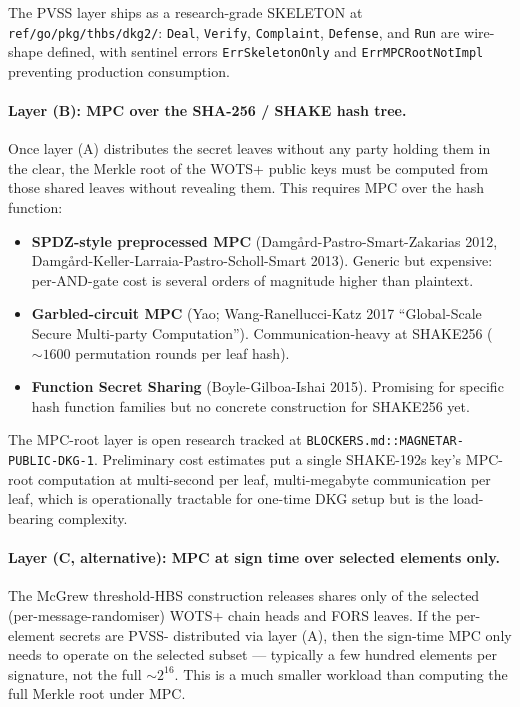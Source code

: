 The PVSS layer ships as a research-grade SKELETON at
\texttt{ref/go/pkg/thbs/dkg2/}:
\texttt{Deal}, \texttt{Verify}, \texttt{Complaint},
\texttt{Defense}, and \texttt{Run} are wire-shape defined, with
sentinel errors \texttt{ErrSkeletonOnly} and
\texttt{ErrMPCRootNotImpl} preventing production consumption.

\paragraph{Layer (B): MPC over the SHA-256 / SHAKE hash tree.}
Once layer (A) distributes the secret leaves without any party
holding them in the clear, the Merkle root of the WOTS+ public
keys must be computed from those shared leaves without
revealing them. This requires MPC over the hash function:
\begin{itemize}[leftmargin=2em,nosep]
  \item \textbf{SPDZ-style preprocessed MPC}
        (Damg{\aa}rd-Pastro-Smart-Zakarias 2012,
        Damg{\aa}rd-Keller-Larraia-Pastro-Scholl-Smart 2013).
        Generic but expensive: per-AND-gate cost is several
        orders of magnitude higher than plaintext.
  \item \textbf{Garbled-circuit MPC} (Yao;
        Wang-Ranellucci-Katz 2017 ``Global-Scale Secure
        Multi-party Computation''). Communication-heavy at
        SHAKE256 ($\sim 1600$ permutation rounds per leaf hash).
  \item \textbf{Function Secret Sharing} (Boyle-Gilboa-Ishai
        2015). Promising for specific hash function families
        but no concrete construction for SHAKE256 yet.
\end{itemize}

The MPC-root layer is open research tracked at
\texttt{BLOCKERS.md::MAGNETAR-PUBLIC-DKG-1}. Preliminary cost
estimates put a single SHAKE-192s key's MPC-root computation at
multi-second per leaf, multi-megabyte communication per leaf,
which is operationally tractable for one-time DKG setup but is
the load-bearing complexity.

\paragraph{Layer (C, alternative): MPC at sign time over selected
elements only.} The McGrew threshold-HBS construction releases
shares only of the selected (per-message-randomiser) WOTS+ chain
heads and FORS leaves. If the per-element secrets are PVSS-
distributed via layer (A), then the sign-time MPC only needs to
operate on the selected subset --- typically a few hundred
elements per signature, not the full $\sim 2^{16}$. This is a
much smaller workload than computing the full Merkle root under
MPC.


